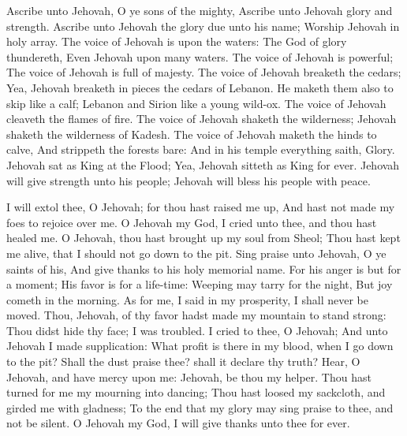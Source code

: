 Ascribe unto Jehovah, O ye sons of the mighty, Ascribe unto Jehovah glory and strength.  Ascribe unto Jehovah the glory due unto his name; Worship Jehovah in holy array.  The voice of Jehovah is upon the waters: The God of glory thundereth, Even Jehovah upon many waters.  The voice of Jehovah is powerful; The voice of Jehovah is full of majesty.  The voice of Jehovah breaketh the cedars; Yea, Jehovah breaketh in pieces the cedars of Lebanon.  He maketh them also to skip like a calf; Lebanon and Sirion like a young wild-ox.  The voice of Jehovah cleaveth the flames of fire.  The voice of Jehovah shaketh the wilderness; Jehovah shaketh the wilderness of Kadesh.  The voice of Jehovah maketh the hinds to calve, And strippeth the forests bare: And in his temple everything saith, Glory.  Jehovah sat as King at the Flood; Yea, Jehovah sitteth as King for ever.  Jehovah will give strength unto his people; Jehovah will bless his people with peace. 

I will extol thee, O Jehovah; for thou hast raised me up, And hast not made my foes to rejoice over me.  O Jehovah my God, I cried unto thee, and thou hast healed me.  O Jehovah, thou hast brought up my soul from Sheol; Thou hast kept me alive, that I should not go down to the pit.  Sing praise unto Jehovah, O ye saints of his, And give thanks to his holy memorial name.  For his anger is but for a moment; His favor is for a life-time: Weeping may tarry for the night, But joy cometh in the morning.  As for me, I said in my prosperity, I shall never be moved.  Thou, Jehovah, of thy favor hadst made my mountain to stand strong: Thou didst hide thy face; I was troubled.  I cried to thee, O Jehovah; And unto Jehovah I made supplication:  What profit is there in my blood, when I go down to the pit? Shall the dust praise thee? shall it declare thy truth?  Hear, O Jehovah, and have mercy upon me: Jehovah, be thou my helper.  Thou hast turned for me my mourning into dancing; Thou hast loosed my sackcloth, and girded me with gladness;  To the end that my glory may sing praise to thee, and not be silent. O Jehovah my God, I will give thanks unto thee for ever. 

